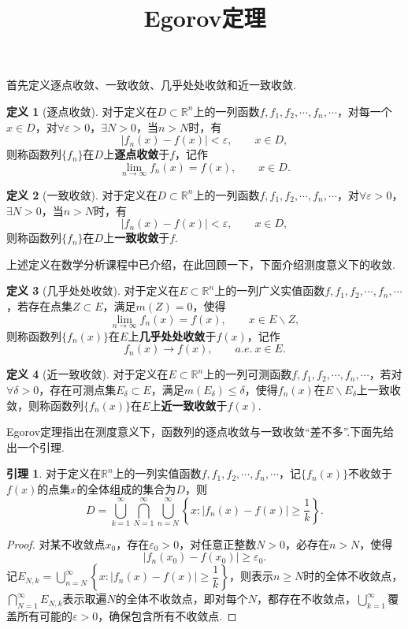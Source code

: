 \documentclass[12pt]{ctexart}
\title{\vspace{-2em}\textbf{Egorov定理}\vspace{-2em}}
\date{ }
\theoremstyle{definition}
\newtheorem{definition}{定义}
\newtheorem{lemma}{引理}
\theoremstyle{plain}
\begin{document}
	\maketitle
	首先定义逐点收敛、一致收敛、几乎处处收敛和近一致收敛.
	\begin{definition}[逐点收敛]
		对于定义在$D\subset \mathbb{R}^n$上的一列函数$f,f_1,f_2,\cdots,f_n,\cdots$，对每一个$x\in D$，对$\forall \varepsilon>0$，$\exists N>0$，当$n>N$时，有
		$$|f_n(x)-f(x)|<\varepsilon,\qquad x\in D,$$
		则称函数列$\{f_n\}$在$D$上\textbf{逐点收敛}于$f$，记作
		$$\lim\limits_{n\to\infty}f_n(x)=f(x),\qquad x\in D.$$
	\end{definition}
	\begin{definition}[一致收敛]
		对于定义在$D\subset \mathbb{R}^n$上的一列函数$f,f_1,f_2,\cdots,f_n,\cdots$，对$\forall \varepsilon>0$，$\exists N>0$，当$n>N$时，有
		$$|f_n(x)-f(x)|<\varepsilon,\qquad x\in D,$$
		则称函数列$\{f_n\}$在$D$上\textbf{一致收敛}于$f$.
	\end{definition}
	上述定义在数学分析课程中已介绍，在此回顾一下，下面介绍测度意义下的收敛.
	\begin{definition}[几乎处处收敛]
		对于定义在$E\subset \mathbb{R}^n$上的一列广义实值函数$f,f_1,f_2,\cdots,f_n,\cdots$，若存在点集$Z\subset E$，满足$m(Z)=0$，使得
		$$\lim\limits_{n\to\infty}f_n(x)=f(x),\qquad x\in E\backslash Z,$$
		则称函数列$\{f_n(x)\}$在$E$上\textbf{几乎处处收敛}于$f(x)$，记作
		$$f_n(x)\to f(x),\qquad a.e.\ x\in E.$$
	\end{definition}
	\begin{definition}[近一致收敛]
		对于定义在$E\subset \mathbb{R}^n$上的一列可测函数$f,f_1,f_2,\cdots,f_n,\cdots$，若对$\forall\delta>0$，存在可测点集$E_{\delta}\subset E$，满足$m(E_{\delta})\leqslant\delta$，使得$f_n(x)$在$E\backslash E_{\delta}$上一致收敛，则称函数列$\{f_n(x)\}$在$E$上\textbf{近一致收敛}于$f(x)$.
	\end{definition}
	Egorov定理指出在测度意义下，函数列的逐点收敛与一致收敛“差不多”.下面先给出一个引理.
	\begin{lemma}
		对于定义在$\mathbb{R}^n$上的一列实值函数$f,f_1,f_2,\cdots,f_n,\cdots$，记$\{f_n(x)\}$不收敛于$f(x)$的点集$x$的全体组成的集合为$D$，则
		$$D=\bigcup_{k=1}^{\infty}\bigcap_{N=1}^{\infty}\bigcup_{n=N}^{\infty}\left\{x:\left|f_n(x)-f(x)\right|\geqslant\frac{1}{k}\right\}.$$
	\end{lemma}
	\begin{proof}
		对某不收敛点$x_0$，存在$\varepsilon_0>0$，对任意正整数$N>0$，必存在$n>N$，使得
		$$\left|f_n(x_0)-f(x_0)\right|\geqslant\varepsilon_0.$$
		记$E_{N,k}=\displaystyle\bigcup_{n=N}^{\infty}\left\{x:\left|f_n(x)-f(x)\right|\geqslant\dfrac{1}{k}\right\}$，则表示$n\geqslant N$时的全体不收敛点，$\displaystyle\bigcap_{N=1}^{\infty}E_{N,k}$表示取遍$N$的全体不收敛点，即对每个$N$，都存在不收敛点，$\displaystyle\bigcup_{k=1}^{\infty}$覆盖所有可能的$\varepsilon>0$，确保包含所有不收敛点.
	\end{proof}
\end{document}
